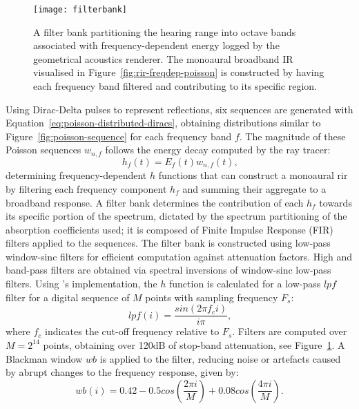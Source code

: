 \begin{figure}[htbp]
    \centering
    \texttt{[image: filterbank]}
    \caption{A filter bank partitioning the hearing range into octave bands associated with frequency-dependent energy logged by the geometrical acoustics renderer. The monoaural broadband IR visualised in Figure~\ref{fig:rir-freqdep-poisson} is constructed by having each frequency band filtered and contributing to its specific region. }
    \label{fig:filterbank}
\end{figure}
Using Dirac-Delta pulses to represent reflections, six sequences are generated with Equation~\ref{eq:poisson-distributed-diracs}, obtaining distributions similar to Figure~\ref{fig:poisson-sequence} for each frequency band $f$. The magnitude of these Poisson sequences $w_{n,f}$ follows the energy decay computed by the ray tracer: 
\begin{equation}
    h_f(t) = E_f(t)w_{n,f}(t)\textrm{,}
\end{equation}
determining frequency-dependent $h$ functions that can construct a monoaural \acrshort{rir} by filtering each frequency component $h_f$ and summing their aggregate to a broadband response. A filter bank determines the contribution of each $h_f$ towards its specific portion of the spectrum, dictated by the spectrum partitioning of the absorption coefficients used; it is composed of Finite Impulse Response (FIR) filters applied to the sequences. The filter bank is constructed using low-pass window-sinc filters for efficient computation against attenuation factors. High and band-pass filters are obtained via spectral inversions of window-sinc low-pass filters. Using \cite{smith1997scientist}'s implementation, the $h$ function is calculated for a low-pass $lpf$ filter for a digital sequence of $M$ points with sampling frequency $F_s$:
\begin{equation}
    lpf(i) = \frac{sin(2\pi f_c i)}{i\pi} \textrm{,}
\end{equation}
where $f_c$ indicates the cut-off frequency relative to $F_s$. Filters are computed over $M = 2^{14}$ points, obtaining over 120dB of stop-band attenuation, see Figure~\ref{fig:filterbank}. A Blackman window $wb$ is applied to the filter, reducing noise or artefacts caused by abrupt changes to the frequency response, given by:
\begin{equation}
    wb(i) = 0.42 - 0.5cos(\frac{2\pi i}{M}) + 0.08cos(\frac{4\pi i}{M})\textrm{.}
\end{equation}


